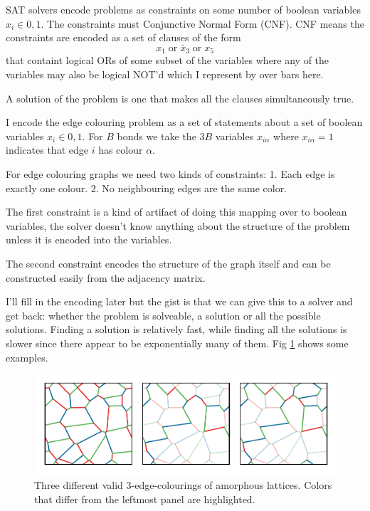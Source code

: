 SAT solvers encode problems as constraints on some number of boolean
variables \(x_i \in {0,1}\). The constraints must Conjunctive Normal
Form (CNF). CNF means the constraints are encoded as a set of clauses of
the form \[x_1 \;\textrm{or}\; \bar{x}_3 \;\textrm{or}\; x_5\] that
containt logical ORs of some subset of the variables where any of the
variables may also be logical NOT'd which I represent by over bars here.

A solution of the problem is one that makes all the clauses
simultaneously true.

I encode the edge colouring problem as a set of statements about a set
of boolean variables \(x_i \in {0,1}\). For \(B\) bonds we take the
\(3B\) variables \(x_{i\alpha}\) where \(x_{i\alpha} = 1\) indicates
that edge \(i\) has colour \(\alpha\).

For edge colouring graphs we need two kinds of constraints: 1. Each edge
is exactly one colour. 2. No neighbouring edges are the same color.

The first constraint is a kind of artifact of doing this mapping over to
boolean variables, the solver doesn't know anything about the structure
of the problem unless it is encoded into the variables.

The second constraint encodes the structure of the graph itself and can
be constructed easily from the adjacency matrix.

I'll fill in the encoding later but the gist is that we can give this to
a solver and get back: whether the problem is solveable, a solution or
all the possible solutions. Finding a solution is relatively fast, while
finding all the solutions is slower since there appear to be
exponentially many of them. Fig \ref{fig:multiple_colourings} shows some
examples.

\begin{figure}
\hypertarget{fig:multiple_colourings}{%
\centering
\includegraphics[width=1\textwidth,height=\textheight]{figure_code/amk_chapter/multiple_colourings/multiple_colourings.pdf}
\caption{Three different valid 3-edge-colourings of amorphous lattices.
Colors that differ from the leftmost panel are
highlighted.}\label{fig:multiple_colourings}
}
\end{figure}

